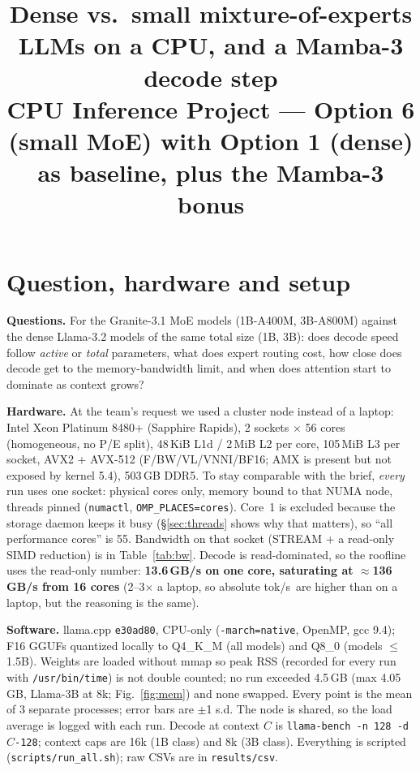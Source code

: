 \documentclass[10pt,twocolumn]{article}
\title{\vspace{-0.6in}\large\textbf{Dense vs.\ small mixture-of-experts LLMs on a CPU, and a Mamba-3 decode step}\\[1pt]
\normalsize CPU Inference Project --- Option 6 (small MoE) with Option 1 (dense) as baseline, plus the Mamba-3 bonus}
\author{\vspace{-0.35in}}
\date{}
\newcommand{\tps}{tok/s}
\begin{document}
\maketitle
\vspace{-0.25in}

\section{Question, hardware and setup}
\textbf{Questions.} For the Granite-3.1 MoE models (1B-A400M, 3B-A800M) against the dense Llama-3.2 models of the same
total size (1B, 3B): does decode speed follow \emph{active} or \emph{total} parameters, what does expert routing cost, how
close does decode get to the memory-bandwidth limit, and when does attention start to dominate as context grows?

\textbf{Hardware.} At the team's request we used a cluster node instead of a laptop: Intel Xeon Platinum 8480+
(Sapphire Rapids), 2 sockets $\times$ 56 cores (homogeneous, no P/E split), 48\,KiB L1d / 2\,MiB L2 per core, 105\,MiB
L3 per socket, AVX2 + AVX-512 (F/BW/VL/VNNI/BF16; AMX is present but not exposed by kernel 5.4), 503\,GB DDR5.
To stay comparable with the brief, \emph{every} run uses one socket: physical cores only, memory bound to that NUMA node,
threads pinned (\texttt{numactl}, \texttt{OMP\_PLACES=cores}). Core~1 is excluded because the storage daemon keeps it busy
(\S\ref{sec:threads} shows why that matters), so ``all performance cores'' is 55. Bandwidth on that socket
(STREAM + a read-only SIMD reduction) is in Table~\ref{tab:bw}. Decode is read-dominated, so the roofline uses the
read-only number: \textbf{13.6\,GB/s on one core, saturating at $\approx$136\,GB/s from 16 cores} (2--3$\times$ a laptop,
so absolute \tps\ are higher than on a laptop, but the reasoning is the same).

\textbf{Software.} llama.cpp \texttt{e30ad80}, CPU-only (\texttt{-march=native}, OpenMP, gcc 9.4); F16 GGUFs quantized
locally to Q4\_K\_M (all models) and Q8\_0 (models $\le$1.5B). Weights are loaded without mmap so peak RSS (recorded for every
run with \texttt{/usr/bin/time}) is not double counted; no run exceeded 4.5\,GB (max 4.05\,GB, Llama-3B at 8k; Fig.~\ref{fig:mem}) and none
swapped. Every point is the mean of 3 separate processes; error bars are $\pm$1 s.d. The node is shared, so the load
average is logged with each run. Decode at context $C$ is \texttt{llama-bench -n 128 -d $C$-128}; context caps are 16k (1B
class) and 8k (3B class). Everything is scripted (\texttt{scripts/run\_all.sh}); raw CSVs are in \texttt{results/csv}.
\end{document}
